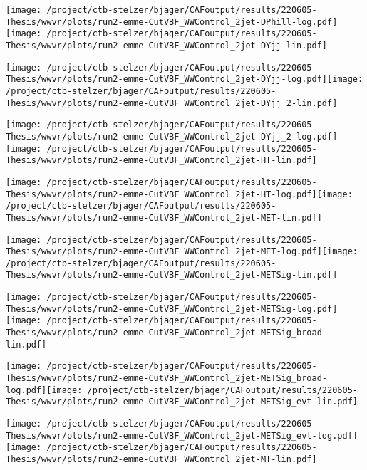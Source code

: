 \documentclass{article}
\begin{document}
\texttt{[image: /project/ctb-stelzer/bjager/CAFoutput/results/220605-Thesis/wwvr/plots/run2-emme-CutVBF\_WWControl\_2jet-DPhill-log.pdf]}\texttt{[image: /project/ctb-stelzer/bjager/CAFoutput/results/220605-Thesis/wwvr/plots/run2-emme-CutVBF\_WWControl\_2jet-DYjj-lin.pdf]}

\texttt{[image: /project/ctb-stelzer/bjager/CAFoutput/results/220605-Thesis/wwvr/plots/run2-emme-CutVBF\_WWControl\_2jet-DYjj-log.pdf]}\texttt{[image: /project/ctb-stelzer/bjager/CAFoutput/results/220605-Thesis/wwvr/plots/run2-emme-CutVBF\_WWControl\_2jet-DYjj\_2-lin.pdf]}

\texttt{[image: /project/ctb-stelzer/bjager/CAFoutput/results/220605-Thesis/wwvr/plots/run2-emme-CutVBF\_WWControl\_2jet-DYjj\_2-log.pdf]}\texttt{[image: /project/ctb-stelzer/bjager/CAFoutput/results/220605-Thesis/wwvr/plots/run2-emme-CutVBF\_WWControl\_2jet-HT-lin.pdf]}

\texttt{[image: /project/ctb-stelzer/bjager/CAFoutput/results/220605-Thesis/wwvr/plots/run2-emme-CutVBF\_WWControl\_2jet-HT-log.pdf]}\texttt{[image: /project/ctb-stelzer/bjager/CAFoutput/results/220605-Thesis/wwvr/plots/run2-emme-CutVBF\_WWControl\_2jet-MET-lin.pdf]}

\texttt{[image: /project/ctb-stelzer/bjager/CAFoutput/results/220605-Thesis/wwvr/plots/run2-emme-CutVBF\_WWControl\_2jet-MET-log.pdf]}\texttt{[image: /project/ctb-stelzer/bjager/CAFoutput/results/220605-Thesis/wwvr/plots/run2-emme-CutVBF\_WWControl\_2jet-METSig-lin.pdf]}

\texttt{[image: /project/ctb-stelzer/bjager/CAFoutput/results/220605-Thesis/wwvr/plots/run2-emme-CutVBF\_WWControl\_2jet-METSig-log.pdf]}\texttt{[image: /project/ctb-stelzer/bjager/CAFoutput/results/220605-Thesis/wwvr/plots/run2-emme-CutVBF\_WWControl\_2jet-METSig\_broad-lin.pdf]}

\texttt{[image: /project/ctb-stelzer/bjager/CAFoutput/results/220605-Thesis/wwvr/plots/run2-emme-CutVBF\_WWControl\_2jet-METSig\_broad-log.pdf]}\texttt{[image: /project/ctb-stelzer/bjager/CAFoutput/results/220605-Thesis/wwvr/plots/run2-emme-CutVBF\_WWControl\_2jet-METSig\_evt-lin.pdf]}

\texttt{[image: /project/ctb-stelzer/bjager/CAFoutput/results/220605-Thesis/wwvr/plots/run2-emme-CutVBF\_WWControl\_2jet-METSig\_evt-log.pdf]}\texttt{[image: /project/ctb-stelzer/bjager/CAFoutput/results/220605-Thesis/wwvr/plots/run2-emme-CutVBF\_WWControl\_2jet-MT-lin.pdf]}
\end{document}
